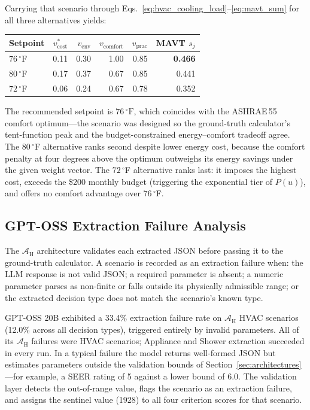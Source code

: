 \documentclass[final,3p,times]{elsarticle}
\begin{document}
Carrying that scenario through Eqs.~\ref{eq:hvac_cooling_load}--\ref{eq:mavt_sum}
for all three alternatives yields:
\begin{center}
\begin{tabular}{@{}lrrrrr@{}}
\toprule
\textbf{Setpoint} & \textbf{$v_{\text{cost}}^{*}$} & \textbf{$v_{\text{env}}$}
  & \textbf{$v_{\text{comfort}}$} & \textbf{$v_{\text{prac}}$}
  & \textbf{MAVT $s_j$} \\
\midrule
$76\,^\circ$F & 0.11 & 0.30 & 1.00 & 0.85 & \textbf{0.466} \\
$80\,^\circ$F & 0.17 & 0.37 & 0.67 & 0.85 & 0.441 \\
$72\,^\circ$F & 0.06 & 0.24 & 0.67 & 0.78 & 0.352 \\
\bottomrule
\end{tabular}
\end{center}
\noindent The recommended setpoint is $76\,^\circ\text{F}$, which coincides
with the ASHRAE\,55 comfort optimum---the scenario was designed so the
ground-truth calculator's tent-function peak and the budget-constrained
energy--comfort tradeoff agree. The $80\,^\circ$F alternative ranks second
despite lower energy cost, because the comfort penalty at four degrees above
the optimum outweighs its energy savings under the given weight vector.
The $72\,^\circ$F alternative ranks last: it imposes the highest cost,
exceeds the \$200 monthly budget (triggering the exponential tier of
$P(u)$), and offers no comfort advantage over $76\,^\circ$F.

\subsection{GPT-OSS Extraction Failure Analysis}
The $\mathcal{A}_{\text{H}}$ architecture validates each extracted JSON
before passing it to the ground-truth calculator. A scenario is recorded
as an extraction failure when: the LLM response is not valid JSON; a
required parameter is absent; a numeric parameter parses as non-finite or
falls outside its physically admissible range; or the extracted decision
type does not match the scenario's known type.

GPT-OSS 20B exhibited a 33.4\% extraction failure rate on
$\mathcal{A}_{\text{H}}$ HVAC scenarios (12.0\% across all decision types),
triggered entirely by invalid parameters. All of its $\mathcal{A}_{\text{H}}$
failures were HVAC scenarios; Appliance and Shower extraction succeeded in
every run. In a typical failure the model returns well-formed JSON but
estimates parameters outside the validation bounds of
Section~\ref{sec:architectures}---for example, a SEER rating of 5 against a
lower bound of 6.0. The validation layer detects the out-of-range value,
flags the scenario as an extraction failure, and assigns the sentinel
value (1928) to all four criterion scores for that scenario.
\end{document}

